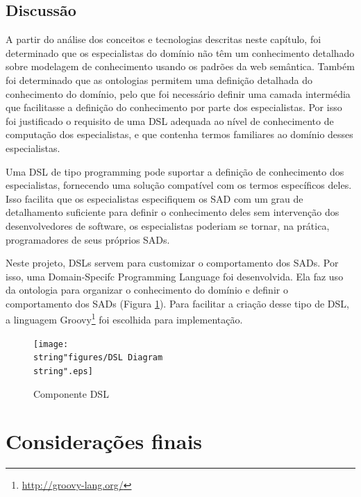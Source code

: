 \subsection*{Discussão}

A partir do análise dos conceitos e tecnologias descritas neste capítulo,
foi determinado que os especialistas do domínio não têm um conhecimento
detalhado sobre modelagem de conhecimento usando os padrões da web
semântica. Também foi determinado que as ontologias permitem uma definição
detalhada do conhecimento do domínio, pelo que foi necessário definir
uma camada intermédia que facilitasse a definição do conhecimento
por parte dos especialistas. Por isso foi justificado o requisito
de uma DSL adequada ao nível de conhecimento de computação dos especialistas,
e que contenha termos familiares ao domínio desses especialistas. 

Uma DSL de tipo \foreignlanguage{english}{programming} pode suportar
a definição de conhecimento dos especialistas, fornecendo uma solução
compatível com os termos específicos deles. Isso facilita que os especialistas
especifiquem os SAD com um grau de detalhamento suficiente para definir
o conhecimento deles sem intervenção dos desenvolvedores de software,
os especialistas poderiam se tornar, na prática, programadores de
seus próprios SADs.

Neste projeto, DSLs servem para customizar o comportamento dos SADs.
Por isso, uma \foreignlanguage{english}{Domain-Specifc Programming
Language }foi desenvolvida. Ela faz uso da ontologia para organizar
o conhecimento do domínio e definir o comportamento dos SADs (Figura
\ref{fig:Componente-DSL}). Para facilitar a criação desse tipo de
DSL, a linguagem \foreignlanguage{english}{Groovy}\footnote{%
\url{http://groovy-lang.org/}%
} foi escolhida para implementação. 

\begin{figure}[H]
\begin{centering}
\texttt{[image: \\string"figures/DSL Diagram\\string".eps]}
\par\end{centering}
\caption{Componente DSL \label{fig:Componente-DSL}}
\end{figure}


\section{Considerações finais}

